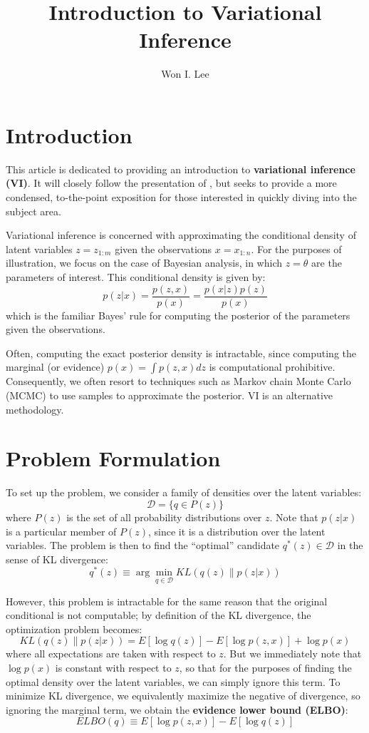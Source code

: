 \documentclass[psamsfonts]{amsart}
\title{Introduction to Variational Inference}
\author{Won I. Lee}
\theoremstyle{definition}
\theoremstyle{remark}
\numberwithin{equation}{section}
\begin{document}
\maketitle
\section{Introduction}
	
This article is dedicated to providing an introduction to {\bf variational inference (VI)}. It will closely follow the presentation of \cite{vi}, but seeks to provide a more condensed, to-the-point exposition for those interested in quickly diving into the subject area.

Variational inference is concerned with approximating the conditional density of latent variables $z = z_{1:m}$ given the observations $x = x_{1:n}$. For the purposes of illustration, we focus on the case of Bayesian analysis, in which $z = \theta$ are the parameters of interest. This conditional density is given by:
$$p(z|x) = \frac{p(z,x)}{p(x)} = \frac{p(x|z)p(z)}{p(x)}$$
which is the familiar Bayes' rule for computing the posterior of the parameters given the observations.

Often, computing the exact posterior density is intractable, since computing the marginal (or evidence) $p(x) = \int p(z,x) dz$ is computational prohibitive. Consequently, we often resort to techniques such as Markov chain Monte Carlo (MCMC) to use samples to approximate the posterior. VI is an alternative methodology.

\section{Problem Formulation}

To set up the problem, we consider a family of densities over the latent variables:
$$\mathcal{D} = \{ q \in P(z) \}$$
where $P(z)$ is the set of all probability distributions over $z$. Note that $p(z|x)$ is a particular member of $P(z)$, since it is a distribution over the latent variables. The problem is then to find the ``optimal'' candidate $q^*(z) \in \mathcal{D}$ in the sense of KL divergence:
$$q^*(z) \equiv \arg\min_{q\in \mathcal{D}} KL(q(z) \| p(z|x))$$

However, this problem is intractable for the same reason that the original conditional is not computable; by definition of the KL divergence, the optimization problem becomes:
$$KL(q(z)\| p(z|x)) = E[\log q(z)] - E[\log p(z,x)] + \log p(x)$$
where all expectations are taken with respect to $z$. But we immediately note that $\log p(x)$ is constant with respect to $z$, so that for the purposes of finding the optimal density over the latent variables, we can simply ignore this term. To minimize KL divergence, we equivalently maximize the negative of divergence, so ignoring the marginal term, we obtain the {\bf evidence lower bound (ELBO)}:
$$ELBO(q) \equiv E[\log p(z,x)] - E[\log q(z)]$$
\end{document}
